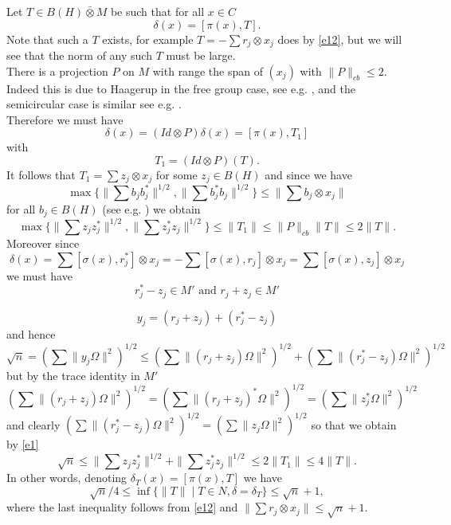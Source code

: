 \documentclass[11pt,leqno]{article}
\theoremstyle{plain}
\theoremstyle{definition}
\theoremstyle{remark}
\numberwithin{equation}{section}
\def\d{\delta}
\def\d{\delta}
\begin{document}
       Let $T \in B(H)\bar {\otimes} M$  be such that for all $x\in C$ $$\d(x)= [\pi(x) , T].$$
       Note that such a $T$ exists, for example  $T=-\sum r_j \otimes x_j$ does by \eqref{e12}, but we will see
       that the norm of any such $T$ must be large.\\
 There is a projection $P$ on $M$ with range the span of $(x_j)$ with $\|P\|_{cb} \le 2$. Indeed
 this is due to Haagerup in  the free group case, see e.g. \cite[p. 184]{100},
 and the semicircular case is similar see e.g. \cite[p. 209]{100}.\\
     Therefore  we must have
       $$\d(x)= (Id \otimes P) \d(x)=[\pi(x) , T_1]$$   
       with
       $$T_1= (Id \otimes P)(T).$$
       It follows that $T_1=\sum z_j \otimes x_j$ for some $z_j\in B(H)$ and since we have
        $$\max\{\| \sum b_j b_j^* \|^{1/2} , \| \sum b_j^* b_j \|^{1/2}\}    \le \|\sum b_j \otimes x_j\|$$ 
        for all $b_j\in B(H)$ (see e.g.    \cite[(9.9.9) p. 208]{100}) we obtain
       \begin{equation}  \label{e1}
        \max\{\| \sum z_j z_j^* \|^{1/2} , \| \sum z_j^* z_j \|^{1/2}\}    \le \|T_1\|\le \|P\|_{cb}\|T\|  \le  2\|T\| .
       \end{equation} 
    Moreover since 
       $$\d(x)= \sum [\sigma(x)  ,   r_j^*] \otimes x_j = - \sum [\sigma(x)  ,   r_j] \otimes x_j =
       \sum [\sigma(x)  ,   z_j] \otimes x_j $$
       we must have
       $$ r_j^*-z_j \in M' \text{  and  }  r_j+z_j \in M' $$
       
       $$y_j=  (r_j +z_j )+ (r_j^*-z_j)  $$
       and hence
       $$\sqrt n=(\sum \|y_j \Omega\|^2)^{1/2} \le   (\sum \|(r_j +z_j ) \Omega\|^2)^{1/2} + (\sum \|(r_j^*-z_j)  \Omega\|^2)^{1/2}  $$
       but  by the trace identity in $M'$
       $$(\sum \|(r_j +z_j ) \Omega\|^2)^{1/2}
       =(\sum \|(r_j +z_j )^* \Omega\|^2)^{1/2} = (\sum \| z_j ^* \Omega\|^2)^{1/2}$$
       and clearly $(\sum \|(r_j^*-z_j)  \Omega\|^2)^{1/2}  = (\sum \| z_j  \Omega\|^2)^{1/2}$  
       so that we obtain by \eqref{e1}
        \begin{equation}  \label{e2}\sqrt n \le  \| \sum z_j z_j^* \|^{1/2} +\| \sum z_j^* z_j \|^{1/2} \le 2 \|T_1\| \le 4\|T\|.\end{equation}
        In other words, denoting $\d_T(x)=[\pi(x),T]$ we have
        \begin{equation}  \label{e13} \sqrt n /4 \le \inf \{ \|T\| \mid T\in N, \d =\d_T \} \le \sqrt n+1,\end{equation} 
        where the last inequality follows from \eqref{e12} and $\|\sum r_j \otimes x_j \|\le  \sqrt n+1$.
        
\end{document}
